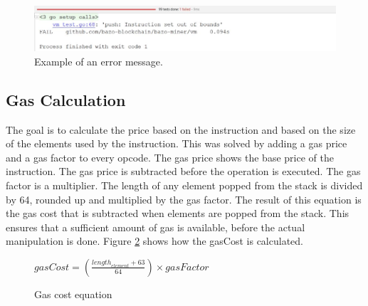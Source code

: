\begin{figure}[H]
	\begin{center}
	\includegraphics[width=\textwidth]{./images/push-test-failure}
	\caption{Example of an error message.}
	\label{pushtestfailure}
	\end{center}
\end{figure}

\subsection{Gas Calculation}
The goal is to calculate the price based on the instruction and based on the size of the elements used by the instruction. This was solved by adding a gas price and a gas factor to every opcode. The gas price shows the base price of the instruction. The gas price is subtracted before the operation is executed. The gas factor is a multiplier. The length of any element popped from the stack is divided by 64, rounded up and multiplied by the gas factor. The result of this equation is the gas cost that is subtracted when elements are popped from the stack. This ensures that a sufficient amount of gas is available, before the actual manipulation is done. Figure \ref{gas_factor_calc} shows how the gasCost is calculated.

\begin{figure}[thp]%
    	\centering
		$
		gasCost=\left( \frac { { length }_{ element }+63 }{ 64 }  \right) \times gasFactor
		$
		\caption{Gas cost equation}
		\label{gas_factor_calc}
\end{figure}

